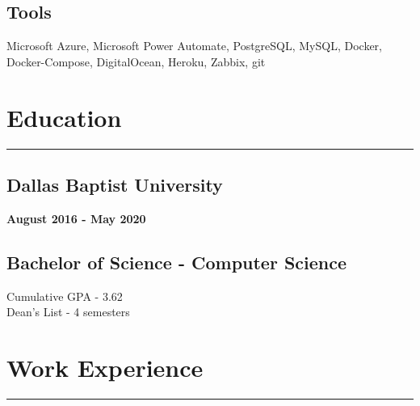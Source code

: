 \documentclass[10pt]{article}
\begin{document}
\subsection*{Tools}
\begin{flushleft}
    Microsoft Azure, Microsoft Power Automate, PostgreSQL, MySQL, Docker, Docker-Compose, DigitalOcean, Heroku, Zabbix, git
\end{flushleft}

\vspace{-.6cm}

\section*{Education}
\vspace{-.6cm}
\par\noindent\textcolor{black}{\rule{\textwidth}{.5pt}} 

\begin{paracol}{2}
    \begin{leftcolumn} \vspace{-.4cm}
        \sloppy
        \subsection*{Dallas Baptist University}
        \textbf{August 2016 -  May 2020}
    \end{leftcolumn}

    \begin{rightcolumn} \vspace{-.4cm}
        \subsection*{Bachelor of Science - Computer Science}
        Cumulative GPA - 3.62 \\
        Dean's List - 4 semesters
    \end{rightcolumn}
\end{paracol}


\vspace{-.4cm}

\section*{Work Experience}
\vspace{-.6cm}
\par\noindent\textcolor{black}{\rule{\textwidth}{.5pt}} 
\end{document}
